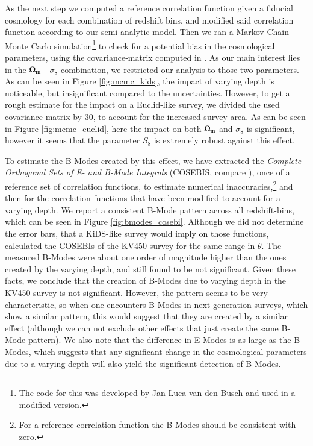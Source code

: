 As the next step we computed a reference correlation function given a fiducial cosmology for each combination of redshift bins, and modified said correlation function according to our semi-analytic model. Then we ran a Markov-Chain Monte Carlo simulation\footnote{The code for this was developed by Jan-Luca van den Busch and used in a modified version.} to check for a potential bias in the cosmological parameters, using the covariance-matrix computed in \citet{2017MNRAS.465.1454H}. As our main interest lies in the $\Omega_{\rm m}$ - $\sigma_8$ combination, we restricted our analysis to those two parameters. As can be seen in Figure \ref{fig:mcmc_kids}, the impact of varying depth is noticeable, but insignificant compared to the uncertainties. However, to get a rough estimate for the impact on a Euclid-like survey, we divided the used covariance-matrix by 30, to account for the increased survey area. As can be seen in Figure \ref{fig:mcmc_euclid}, here the impact on both $\Omega_{\rm m}$ and $\sigma_8$ is significant, however it seems that the parameter $S_8$ is extremely robust against this effect.

To estimate the B-Modes created by this effect, we have extracted the \emph{Complete Orthogonal Sets of E- and B-Mode Integrals} (COSEBIS, compare \citet{2010A&A...520A.116S}), once of a reference set of correlation functions, to estimate numerical inaccuracies,\footnote{For a reference correlation function the B-Modes should be consistent with zero.} and then for the correlation functions that have been modified to account for a varying depth. We report a consistent B-Mode pattern across all redshift-bins, which can be seen in Figure \ref{fig:bmodes_cosebi}. Although we did not determine the error bars, that a KiDS-like survey would imply on those functions, \citet{2018arXiv181110596A} calculated the COSEBIs of the KV450 survey for the same range in $\theta$. The measured B-Modes were about one order of magnitude higher than the ones created by the varying depth, and still found to be not significant. Given these facts, we conclude that the creation of B-Modes due to varying depth in the KV450 survey is not significant. However, the pattern seems to be very characteristic, so when one encounters B-Modes in next generation surveys, which show a similar pattern, this would suggest that they are created by a similar effect (although we can not exclude other effects that just create the same B-Mode pattern). We also note that the difference in E-Modes is as large as the B-Modes, which suggests that any significant change in the cosmological parameters due to a varying depth will also yield the significant detection of B-Modes.


